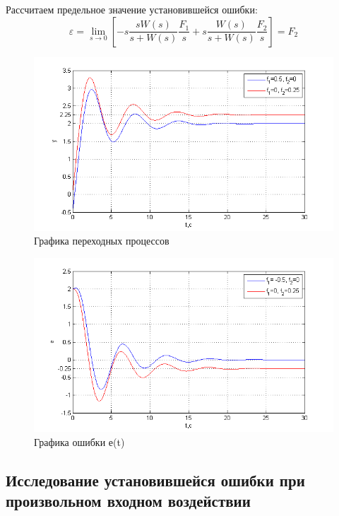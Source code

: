\documentclass[a4paper, 12pt]{article}
\begin{document}
Рассчитаем предельное значение установившейся ошибки:
\begin{equation}
\varepsilon  = \mathop {\lim }\limits_{s \to 0} [ - s\frac{{sW(s)}}{{s + W(s)}}\frac{{{F_1}}}{s} + s\frac{{W(s)}}{{s + W(s)}}\frac{{{F_2}}}{s}] = {F_2}
\end{equation}
\begin{center}
	\begin{figure}[H]
		\centering
			\includegraphics[width=0.95\linewidth]{10}
		\caption{Графика переходных процессов}
		\label{fig:10}
	\end{figure}
\end{center}
\newpage
\begin{figure}[h]
	\centering
	\includegraphics[width=0.95\linewidth]{13}
	\caption{Графика ошибки е(t)}
	\label{fig:13}
\end{figure}
\clearpage
\begin{center}
\section{Исследование установившейся ошибки при произвольном входном воздействии}\hfill\par
\end{center}
\end{document}
